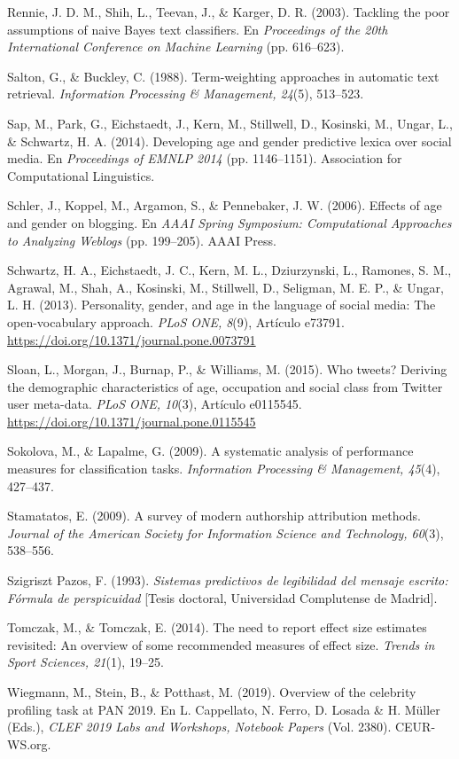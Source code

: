 \documentclass[10pt,twocolumn]{article}
\begin{document}
\begin{list}{}{\setlength{\leftmargin}{1.5em}\setlength{\itemindent}{-1.5em}\setlength{\itemsep}{2pt}\setlength{\parsep}{0pt}}
\item Rennie, J. D. M., Shih, L., Teevan, J., \& Karger, D. R. (2003). Tackling the poor assumptions of naive Bayes text classifiers. En \textit{Proceedings of the 20th International Conference on Machine Learning} (pp. 616–623).
\item Salton, G., \& Buckley, C. (1988). Term-weighting approaches in automatic text retrieval. \textit{Information Processing \& Management, 24}(5), 513–523.
\item Sap, M., Park, G., Eichstaedt, J., Kern, M., Stillwell, D., Kosinski, M., Ungar, L., \& Schwartz, H. A. (2014). Developing age and gender predictive lexica over social media. En \textit{Proceedings of EMNLP 2014} (pp. 1146–1151). Association for Computational Linguistics.
\item Schler, J., Koppel, M., Argamon, S., \& Pennebaker, J. W. (2006). Effects of age and gender on blogging. En \textit{AAAI Spring Symposium: Computational Approaches to Analyzing Weblogs} (pp. 199–205). AAAI Press.
\item Schwartz, H. A., Eichstaedt, J. C., Kern, M. L., Dziurzynski, L., Ramones, S. M., Agrawal, M., Shah, A., Kosinski, M., Stillwell, D., Seligman, M. E. P., \& Ungar, L. H. (2013). Personality, gender, and age in the language of social media: The open-vocabulary approach. \textit{PLoS ONE, 8}(9), Artículo e73791. \url{https://doi.org/10.1371/journal.pone.0073791} \textdagger{}
\item Sloan, L., Morgan, J., Burnap, P., \& Williams, M. (2015). Who tweets? Deriving the demographic characteristics of age, occupation and social class from Twitter user meta-data. \textit{PLoS ONE, 10}(3), Artículo e0115545. \url{https://doi.org/10.1371/journal.pone.0115545} \textdagger{}
\item Sokolova, M., \& Lapalme, G. (2009). A systematic analysis of performance measures for classification tasks. \textit{Information Processing \& Management, 45}(4), 427–437.
\item Stamatatos, E. (2009). A survey of modern authorship attribution methods. \textit{Journal of the American Society for Information Science and Technology, 60}(3), 538–556.
\item Szigriszt Pazos, F. (1993). \textit{Sistemas predictivos de legibilidad del mensaje escrito: Fórmula de perspicuidad} [Tesis doctoral, Universidad Complutense de Madrid].
\item Tomczak, M., \& Tomczak, E. (2014). The need to report effect size estimates revisited: An overview of some recommended measures of effect size. \textit{Trends in Sport Sciences, 21}(1), 19–25.
\item Wiegmann, M., Stein, B., \& Potthast, M. (2019). Overview of the celebrity profiling task at PAN 2019. En L. Cappellato, N. Ferro, D. Losada \& H. Müller (Eds.), \textit{CLEF 2019 Labs and Workshops, Notebook Papers} (Vol. 2380). CEUR-WS.org. \textdagger{}
\end{list}
\end{document}
